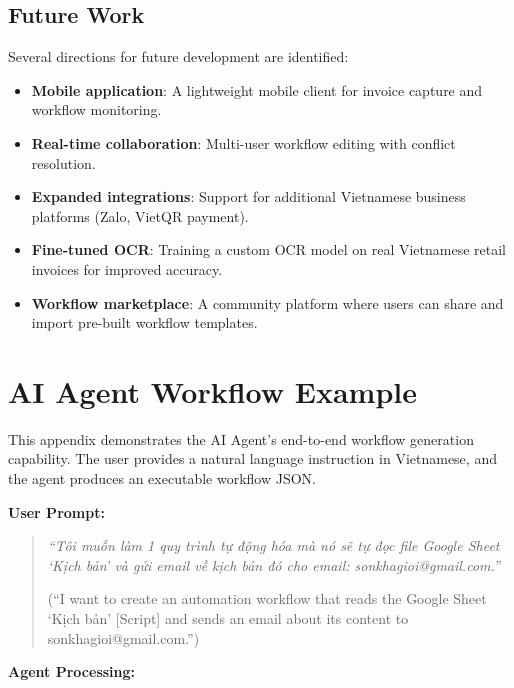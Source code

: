 \documentclass[11pt,a4paper]{report}
\begin{document}
\section{Future Work}

Several directions for future development are identified:

\begin{itemize}
  \item \textbf{Mobile application}: A lightweight mobile client for invoice capture and workflow monitoring.
  \item \textbf{Real-time collaboration}: Multi-user workflow editing with conflict resolution.
  \item \textbf{Expanded integrations}: Support for additional Vietnamese business platforms (Zalo, VietQR payment).
  \item \textbf{Fine-tuned OCR}: Training a custom OCR model on real Vietnamese retail invoices for improved accuracy.
  \item \textbf{Workflow marketplace}: A community platform where users can share and import pre-built workflow templates.
\end{itemize}

\appendix

\chapter{AI Agent Workflow Example}
\label{app:agent-example}

This appendix demonstrates the AI Agent's end-to-end workflow generation capability. The user provides a natural language instruction in Vietnamese, and the agent produces an executable workflow JSON.

\medskip
\noindent\textbf{User Prompt:}

\begin{quote}
\textit{``Tôi muốn làm 1 quy trình tự động hóa mà nó sẽ tự đọc file Google Sheet `Kịch bản' và gửi email về kịch bản đó cho email: sonkhagioi@gmail.com.''}

\medskip
(``I want to create an automation workflow that reads the Google Sheet `Kịch bản' [Script] and sends an email about its content to sonkhagioi@gmail.com.'')
\end{quote}

\noindent\textbf{Agent Processing:}
\end{document}
